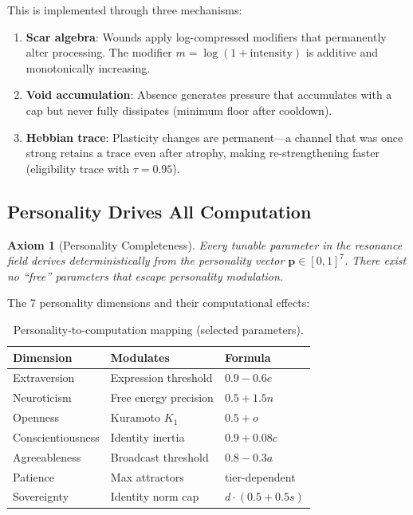 \documentclass[11pt]{article}
\newtheorem{axiom}{Axiom}[section]
\begin{document}
This is implemented through three mechanisms:
\begin{enumerate}[leftmargin=*]
\item \textbf{Scar algebra}: Wounds apply log-compressed modifiers that permanently alter processing. The modifier $m = \log(1 + \text{intensity})$ is additive and monotonically increasing.
\item \textbf{Void accumulation}: Absence generates pressure that accumulates with a cap but never fully dissipates (minimum floor after cooldown).
\item \textbf{Hebbian trace}: Plasticity changes are permanent---a channel that was once strong retains a trace even after atrophy, making re-strengthening faster (eligibility trace with $\tau = 0.95$).
\end{enumerate}

\subsection{Personality Drives All Computation}
\label{sec:personality_axiom}

\begin{axiom}[Personality Completeness]
Every tunable parameter in the resonance field derives deterministically from the personality vector $\mathbf{p} \in [0,1]^7$. There exist no ``free'' parameters that escape personality modulation.
\end{axiom}

The 7 personality dimensions and their computational effects:

\begin{table}[htbp]
\centering
\caption{Personality-to-computation mapping (selected parameters).}
\label{tab:personality}
\begin{tabular}{@{}lll@{}}
\toprule
Dimension & Modulates & Formula \\
\midrule
Extraversion & Expression threshold & $0.9 - 0.6e$ \\
Neuroticism & Free energy precision & $0.5 + 1.5n$ \\
Openness & Kuramoto $K_1$ & $0.5 + o$ \\
Conscientiousness & Identity inertia & $0.9 + 0.08c$ \\
Agreeableness & Broadcast threshold & $0.8 - 0.3a$ \\
Patience & Max attractors & tier-dependent \\
Sovereignty & Identity norm cap & $d \cdot (0.5 + 0.5s)$ \\
\bottomrule
\end{tabular}
\end{table}
\end{document}
